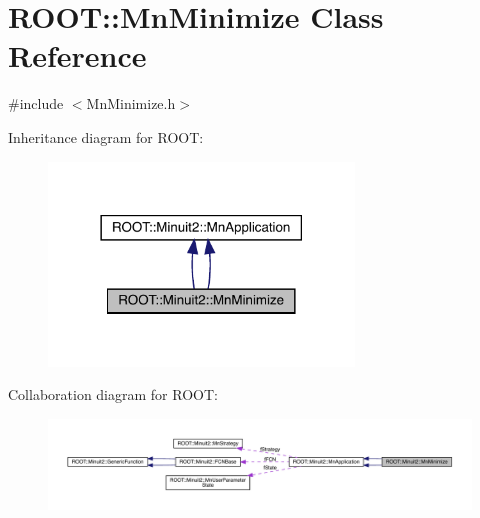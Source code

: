 \hypertarget{classROOT_1_1Minuit2_1_1MnMinimize}{}\section{R\+O\+OT\+:\+:Mn\+Minimize Class Reference}
\label{classROOT_1_1Minuit2_1_1MnMinimize}


{\ttfamily \#include $<$Mn\+Minimize.\+h$>$}



Inheritance diagram for R\+O\+OT\+:\nopagebreak
\begin{figure}[H]
\begin{center}
\leavevmode
\includegraphics[width=230pt]{d2/df5/classROOT_1_1Minuit2_1_1MnMinimize__inherit__graph}
\end{center}
\end{figure}


Collaboration diagram for R\+O\+OT\+:\nopagebreak
\begin{figure}[H]
\begin{center}
\leavevmode
\includegraphics[width=350pt]{d0/dfd/classROOT_1_1Minuit2_1_1MnMinimize__coll__graph}
\end{center}
\end{figure}
